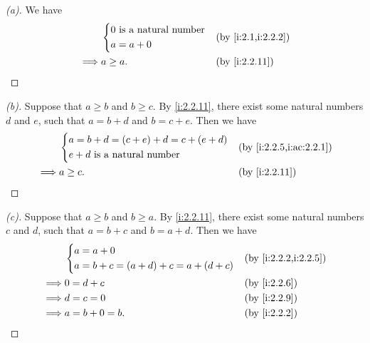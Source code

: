 \begin{proof}[(a)]
  We have
  \begin{align*}
             & \begin{dcases}
                 0 \text{ is a natural number} \\
                 a = a + 0
               \end{dcases} &  & \by{i:2.1,i:2.2.2}                \\
    \implies & a \geq a.                        &  & \by{i:2.2.11}
  \end{align*}
\end{proof}

\begin{proof}[(b)]
  Suppose that \(a \geq b\) and \(b \geq c\).
  By \cref{i:2.2.11}, there exist some natural numbers \(d\) and \(e\), such that \(a = b + d\) and \(b = c + e\).
  Then we have
  \begin{align*}
             & \begin{dcases}
                 a = b + d = (c + e) + d = c + (e + d) \\
                 e + d \text{ is a natural number}
               \end{dcases} &  & \by{i:2.2.5,i:ac:2.2.1}                   \\
    \implies & a \geq c.                                &  & \by{i:2.2.11}
  \end{align*}
\end{proof}

\begin{proof}[(c)]
  Suppose that \(a \geq b\) and \(b \geq a\).
  By \cref{i:2.2.11}, there exist some natural numbers \(c\) and \(d\), such that \(a = b + c\) and \(b = a + d\).
  Then we have
  \begin{align*}
             & \begin{dcases}
                 a = a + 0 \\
                 a = b + c = (a + d) + c = a + (d + c)
               \end{dcases} &  & \by{i:2.2.2,i:2.2.5}                  \\
    \implies & 0 = d + c                             &  & \by{i:2.2.6} \\
    \implies & d = c = 0                             &  & \by{i:2.2.9} \\
    \implies & a = b + 0 = b.                        &  & \by{i:2.2.2}
  \end{align*}
\end{proof}

